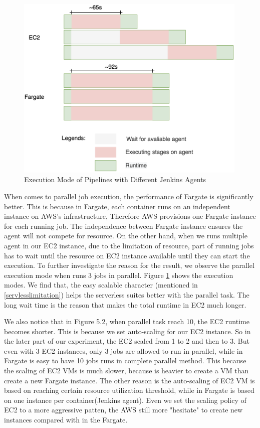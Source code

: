 \begin{figure}[h]
    \centering
    \includegraphics[width=0.99\textwidth]{pics/parallel.png}
    \caption{Execution Mode of Pipelines with Different Jenkins Agents}
    \label{fig:parallel}
\end{figure}
\par
When comes to parallel job execution, the performance of Fargate is significantly better. This is because in Fargate, each container runs on an independent instance on AWS's infrastructure, Therefore AWS provisions one Fargate instance for each running job. The independence between Fargate instance ensures the agent will not compete for resource. On the other hand, when we runs multiple agent in our EC2 instance, due to the limitation of resource, part of running jobs has to wait until the resource on EC2 instance available until they can start the execution. To further investigate the reason for the result, we observe the parallel execution mode when runs 3 jobs in parallel. Figure \ref{fig:parallel} shows the execution modes. We find that, the easy scalable character (mentioned in \ref{servlesslimitation}) helps the serverless suites better with the parallel task. The long wait time is the reason that makes the total runtime in EC2 much longer. 
\par
We also notice that in Figure 5.2, when parallel task reach 10, the EC2 runtime becomes shorter. This is because we set auto-scaling for our EC2 instance. So in the later part of our experiment, the EC2 scaled from 1 to 2 and then to 3. But even with 3 EC2 instances, only 3 jobs are allowed to run in parallel, while in Fargate is easy to have 10 jobs runs in complete parallel method. This because the scaling of EC2 VMs is much slower, because is heavier to create a VM than create a new Fargate instance. The other reason is the auto-scaling of EC2 VM is based on reaching certain resource utilization threshold, while in Fargate is based on one instance per container(Jenkins agent). Even we set the scaling policy of EC2 to a more aggressive patten, the AWS still more "hesitate" to create new instances compared with in the Fargate.

